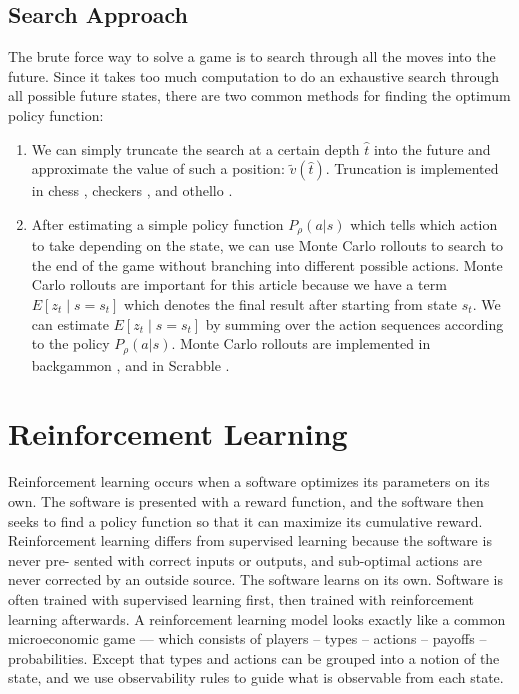 \documentclass[11pt]{article}
\begin{document}
\subsection{Search Approach}
The brute force way to solve a game is to search through all the moves into the future. Since it
takes too much computation to do an exhaustive search through all possible future states, there
are two common methods for finding the optimum policy function:
\begin{enumerate}
\item We can simply truncate the search at a certain depth $\hat t$ into the future and approximate
the value of such a position: $\tilde v(\hat t)$. Truncation is implemented in chess \cite{campbell2002}, checkers \cite{schaeffer1992}, and
othello \cite{buro1999}.
\item After estimating a simple policy function $P_\rho(a|s)$ which tells which action to take depending
on the state, we can use Monte Carlo rollouts to search to the end of the game without
branching into different possible actions. Monte Carlo rollouts are important for this article
because we have a term $E[z_t\mid s=s_t]$ which denotes the final result after starting from
state $s_t$. We can estimate $E[z_t\mid s=s_t]$ by summing over the action sequences according
to the policy $P_\rho(a|s)$. Monte Carlo rollouts are implemented in backgammon \cite{tesauro1996}, and in
Scrabble \cite{sheppard2002}.
\end{enumerate}

\section{Reinforcement Learning}
Reinforcement learning occurs when a software optimizes its parameters on its own. The software
is presented with a reward function, and the software then seeks to find a policy function so that
it can maximize its cumulative reward.
Reinforcement learning differs from supervised learning because the software is never pre-
sented with correct inputs or outputs, and sub-optimal actions are never corrected by an outside
source. The software learns on its own. Software is often trained with supervised learning first,
then trained with reinforcement learning afterwards.
A reinforcement learning model looks exactly like a common microeconomic game --- which
consists of players -- types -- actions -- payoffs -- probabilities. Except that types and actions can
be grouped into a notion of the state, and we use observability rules to guide what is observable
from each state.
\end{document}
